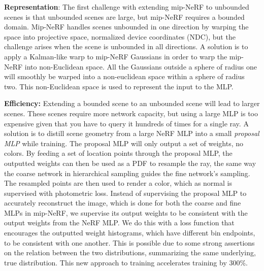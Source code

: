\textbf{Representation}:
The first challenge with extending mip-NeRF to unbounded scenes is that unbounded scenes are large, but mip-NeRF requires a bounded domain. Mip-NeRF handles scenes unbounded in one direction by warping the space into projective space, normalized device coordinates (NDC), but the challenge arises when the scene is unbounded in all directions. A solution is to apply a Kalman-like warp to mip-NeRF Gaussians in order to warp the mip-NeRF into non-Euclidean space. All the Gaussians outside a sphere of radius one will smoothly be warped into a non-euclidean space within a sphere of radius two. This non-Euclidean space is used to represent the input to the MLP. 


\textbf{Efficiency:}
Extending a bounded scene to an unbounded scene will lead to larger scenes. These scenes require more network capacity, but using a large MLP is too expensive given that you have to query it hundreds of times for a single ray. A solution is to distill scene geometry from a large NeRF MLP into a small \textit{proposal MLP} while training. The proposal MLP will only output a set of weights, no colors. By feeding a set of location points through the proposal MLP, the outputted weights can then be used as a PDF to resample the ray, the same way the coarse network in hierarchical sampling guides the fine network's sampling. The resampled points are then used to render a color, which as normal is supervised with photometric loss. Instead of supervising the proposal MLP to accurately reconstruct the image, which is done for both the coarse and fine MLPs in mip-NeRF, we supervise its output weights to be consistent with the output weights from the NeRF MLP. We do this with a loss function that encourages the outputted weight histograms, which have different bin endpoints, to be consistent with one another. This is possible due to some strong assertions on the relation between the two distributions, summarizing the same underlying, true distribution. This new approach to training accelerates training by 300\%.

